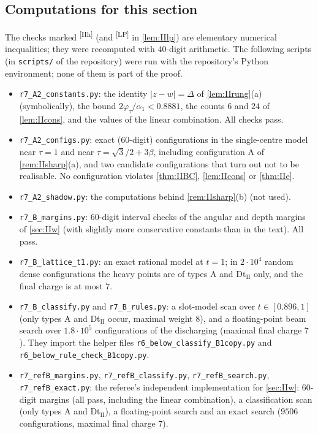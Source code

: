 \documentclass[11pt]{amsart}
\theoremstyle{definition}
\theoremstyle{remark}
\newcommand{\chk}[1]{\textsuperscript{[#1]}}
\begin{document}
\subsection{Computations for this section}\label{sec:IIchecks}
The checks marked \chk{IIh} (and \chk{LP} in \cref{lem:IIlp}) are elementary numerical inequalities; they were recomputed with $40$-digit arithmetic. The following scripts (in \texttt{scripts/} of the repository) were run with the repository's Python environment; none of them is part of the proof.
\begin{itemize}[leftmargin=2em]
\item \texttt{r7\_A2\_constants.py}: the identity $|z-w|=\Delta$ of \cref{lem:IIrung}(a) (symbolically), the bound $2\varphi_\tau/\alpha_1<0.8881$, the counts $6$ and $24$ of \cref{lem:IIcons}, and the values of the linear combination. All checks pass.
\item \texttt{r7\_A2\_configs.py}: exact ($60$-digit) configurations in the single-centre model near $\tau=1$ and near $\tau=\sqrt3/2+3\beta$, including configuration A of \cref{rem:IIsharp}(a), and two candidate configurations that turn out not to be realisable. No configuration violates \cref{thm:IIBC}, \cref{lem:IIcons} or \cref{thm:IIe}.
\item \texttt{r7\_A2\_shadow.py}: the computations behind \cref{rem:IIsharp}(b) (not used).
\item \texttt{r7\_B\_margins.py}: $60$-digit interval checks of the angular and depth margins of \cref{sec:IIw} (with slightly more conservative constants than in the text). All pass.
\item \texttt{r7\_B\_lattice\_t1.py}: an exact rational model at $t=1$; in $2\cdot10^4$ random dense configurations the heavy points are of types A and Dt$_{\mathrm{II}}$ only, and the final charge is at most $7$.
\item \texttt{r7\_B\_classify.py} and \texttt{r7\_B\_rules.py}: a slot-model scan over $t\in[0.896,1]$ (only types A and Dt$_{\mathrm{II}}$ occur, maximal weight $8$), and a floating-point beam search over $1.8\cdot10^5$ configurations of the discharging (maximal final charge $7$). They import the helper files \texttt{r6\_below\_classify\_B1copy.py} and \texttt{r6\_below\_rule\_check\_B1copy.py}.
\item \texttt{r7\_refB\_margins.py}, \texttt{r7\_refB\_classify.py}, \texttt{r7\_refB\_search.py}, \texttt{r7\_refB\_exact.py}: the referee's independent implementation for \cref{sec:IIw}: $60$-digit margins (all pass, including the linear combination), a classification scan (only types A and Dt$_{\mathrm{II}}$), a floating-point search and an exact search ($9506$ configurations, maximal final charge $7$).
\end{itemize}
\end{document}
